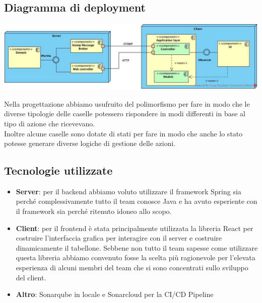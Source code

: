 \documentclass{article}
\begin{document}
\subsection{Diagramma di deployment}
\href{https://github.com/UnimibSoftEngCourse2022/progetto-monopoly-1-gangoffour2/blob/feat/doc/doc/img/DiagrammaDiDeployment.jpg?raw=true}
	{\includegraphics[width=\textwidth]{img/DiagrammaDiDeployment.jpg}}

Nella progettazione abbiamo usufruito del polimorfismo per fare in modo che le diverse tipologie delle caselle potessero rispondere in modi differenti in base al tipo di azione che ricevevano. \\
Inoltre alcune caselle sono dotate di stati per fare in modo che anche lo stato potesse generare diverse logiche di gestione delle azioni.

\subsection{Tecnologie utilizzate}
\begin{itemize}
	\item \textbf{Server}: per il backend abbiamo voluto utilizzare il framework Spring sia perché complessivamente tutto il team conosce Java e ha avuto esperiente con il framework sia perché ritenuto idoneo allo scopo.


	\item \textbf{Client}: per il frontend è stata principalmente utilizzata la libreria React per costruire l'interfaccia grafica per interagire con il server e costruire dinamicamente il tabellone.
	Sebbene non tutto il team sapesse come utilizzare questa libreria abbiamo convenuto fosse la scelta più ragionevole per l'elevata esperienza di alcuni membri del team che si sono concentrati sullo sviluppo del client.
	
	\item \textbf{Altro}: Sonarqube in locale e Sonarcloud per la CI/CD Pipeline
\end{itemize}
\end{document}

